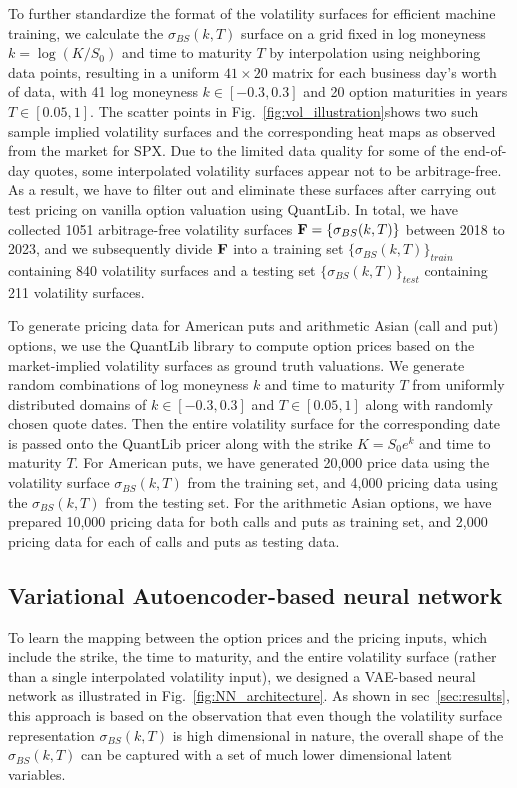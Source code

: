 \documentclass[%
 reprint,
 superscriptaddress,
nobibnotes,
 amsmath,amssymb,
 aip,
]{revtex4-2}
\begin{document}
To further standardize the format of the volatility surfaces for efficient machine training, we calculate the $\sigma_{BS}(k,T)$ surface on a grid fixed in log moneyness $k=\log(K/S_0)$ and time to maturity $T$ by interpolation using neighboring data points, resulting in a uniform $41\times 20$ matrix for each business day's worth of data, with 41 log moneyness $k \in [-0.3,0.3]$ and 20 option maturities in years $T\in[0.05, 1]$. The scatter points in Fig.~\ref{fig:vol_illustration}shows two such sample implied volatility surfaces and the corresponding heat maps as observed from the market for SPX. Due to the limited data quality for some of the end-of-day quotes, some interpolated volatility surfaces appear not to be arbitrage-free. As a result, we have to filter out and eliminate these surfaces after carrying out test pricing on vanilla option valuation using QuantLib. In total, we have collected 1051 arbitrage-free volatility surfaces $\vb{F} = \{\sigma_{BS}(k,T)\}$ between 2018 to 2023, and we subsequently divide $\vb{F}$ into a training set $\{\sigma_{BS}(k,T)\}_{train}$ containing 840 volatility surfaces and a testing set $\{\sigma_{BS}(k,T)\}_{test}$ containing 211 volatility surfaces.


To generate pricing data for American puts and arithmetic Asian (call and put) options, we use the QuantLib library to compute option prices based on the market-implied volatility surfaces as ground truth valuations. We generate random combinations of log moneyness $k$ and time to maturity $T$ from uniformly distributed domains of $k \in [-0.3,0.3]$ and $T\in[0.05, 1]$ along with randomly chosen quote dates. Then the entire volatility surface for the corresponding date is passed onto the QuantLib pricer along with the strike $K=S_0 e^k$ and time to maturity $T$. For American puts, we have generated 20,000 price data using the volatility surface $\sigma_{BS}(k,T)$ from the training set, and 4,000 pricing data using the $\sigma_{BS}(k,T)$ from the testing set. For the arithmetic Asian options, we have prepared 10,000 pricing data for both calls and puts as training set, and 2,000 pricing data for each of calls and puts as testing data.

\subsection{Variational Autoencoder-based neural network}
\label{ssec:vae}
To learn the mapping between the option prices and the pricing inputs, which include the strike, the time to maturity, and the entire volatility surface (rather than a single interpolated volatility input), we designed a VAE-based neural network as illustrated in Fig.~\ref{fig:NN_architecture}. As shown in sec~\ref{sec:results}, this approach is based on the observation that even though the volatility surface representation $\sigma_{BS}(k,T)$ is high dimensional in nature, the overall shape of the $\sigma_{BS}(k,T)$ can be captured with a set of much lower dimensional latent variables. 
\end{document}
